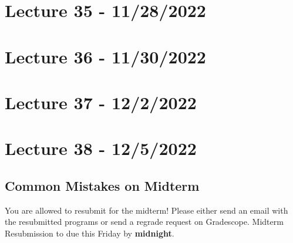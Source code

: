 \documentclass{article}
\begin{document}
\section{Lecture 35 - 11/28/2022}

\section{Lecture 36 - 11/30/2022}

\section{Lecture 37 - 12/2/2022}

\section{Lecture 38 - 12/5/2022}

\subsection{Common Mistakes on Midterm}

You are allowed to resubmit for the midterm! Please either send an email with the resubmitted programs or send a regrade request on Gradescope. Midterm Resubmission to due this Friday by \textbf{midnight}.\\
\end{document}
